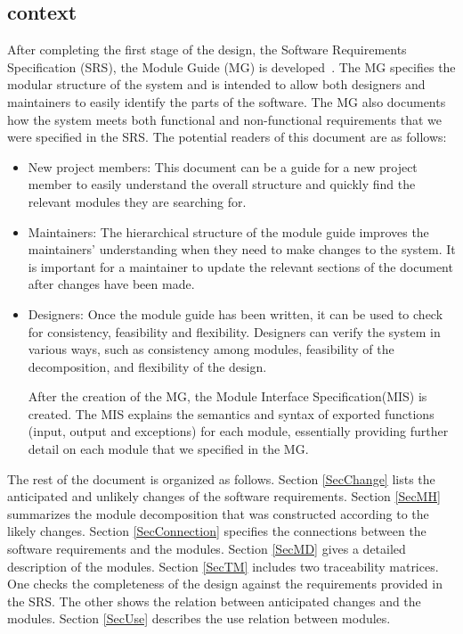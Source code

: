 \documentclass[12pt, titlepage]{article}
\begin{document}
\subsection{context}

After completing the first stage of the design, the Software Requirements
Specification (SRS), the Module Guide (MG) is developed~\citep{ParnasEtAl1984}. The MG
specifies the modular structure of the system and is intended to allow both
designers and maintainers to easily identify the parts of the software. The MG also documents how the system meets both functional and non-functional requirements that we were specified in the SRS. The
potential readers of this document are as follows:

\begin{itemize}
\item New project members: This document can be a guide for a new project member
  to easily understand the overall structure and quickly find the
  relevant modules they are searching for.
\item Maintainers: The hierarchical structure of the module guide improves the
  maintainers' understanding when they need to make changes to the system. It is
  important for a maintainer to update the relevant sections of the document
  after changes have been made.
\item Designers: Once the module guide has been written, it can be used to
  check for consistency, feasibility and flexibility. Designers can verify the
  system in various ways, such as consistency among modules, feasibility of the
  decomposition, and flexibility of the design.~\citep{Bokahari2018}

After the creation of the MG, the Module Interface Specification(MIS) is created. The MIS explains the semantics and syntax of exported functions (input, output and exceptions) for each module, essentially providing further detail on each module that we specified in the MG.~\citep{calce_fenster_tatasciore_2016}
\end{itemize}

The rest of the document is organized as follows. Section
\ref{SecChange} lists the anticipated and unlikely changes of the software
requirements. Section \ref{SecMH} summarizes the module decomposition that
was constructed according to the likely changes. Section \ref{SecConnection}
specifies the connections between the software requirements and the
modules. Section \ref{SecMD} gives a detailed description of the
modules. Section \ref{SecTM} includes two traceability matrices. One checks
the completeness of the design against the requirements provided in the SRS. The
other shows the relation between anticipated changes and the modules. Section
\ref{SecUse} describes the use relation between modules.
\end{document}
